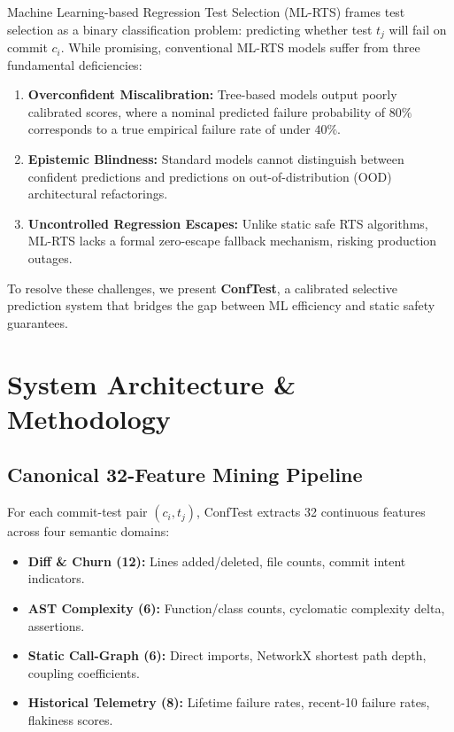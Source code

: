 \documentclass[sigconf,screen]{acmart}
\begin{document}
Machine Learning-based Regression Test Selection (ML-RTS) frames test selection as a binary classification problem: predicting whether test $t_j$ will fail on commit $c_i$. While promising, conventional ML-RTS models suffer from three fundamental deficiencies:
\begin{enumerate}
    \item \textbf{Overconfident Miscalibration:} Tree-based models output poorly calibrated scores, where a nominal predicted failure probability of $80\%$ corresponds to a true empirical failure rate of under $40\%$.
    \item \textbf{Epistemic Blindness:} Standard models cannot distinguish between confident predictions and predictions on out-of-distribution (OOD) architectural refactorings.
    \item \textbf{Uncontrolled Regression Escapes:} Unlike static safe RTS algorithms, ML-RTS lacks a formal zero-escape fallback mechanism, risking production outages.
\end{enumerate}

To resolve these challenges, we present \textbf{ConfTest}, a calibrated selective prediction system that bridges the gap between ML efficiency and static safety guarantees.

\section{System Architecture \& Methodology}
\subsection{Canonical 32-Feature Mining Pipeline}
For each commit-test pair $(c_i, t_j)$, ConfTest extracts 32 continuous features across four semantic domains:
\begin{itemize}
    \item \textbf{Diff \& Churn (12):} Lines added/deleted, file counts, commit intent indicators.
    \item \textbf{AST Complexity (6):} Function/class counts, cyclomatic complexity delta, assertions.
    \item \textbf{Static Call-Graph (6):} Direct imports, NetworkX shortest path depth, coupling coefficients.
    \item \textbf{Historical Telemetry (8):} Lifetime failure rates, recent-10 failure rates, flakiness scores.
\end{itemize}
\end{document}
